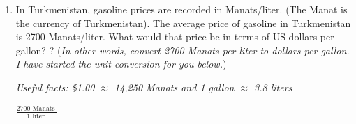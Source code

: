 \documentclass[12pt]{article}
\begin{document}
\begin{enumerate}
\noindent \hrulefill

\item In Turkmenistan, gasoline prices are recorded in Manats/liter.  (The Manat is the currency of Turkmenistan).  The average price of gasoline in Turkmenistan is 2700 Manats/liter.  What would that price be in terms of US dollars per gallon? ? (\emph{In other words, convert 2700 Manats per liter to dollars per gallon.  I have started the unit conversion for you below.})


\emph{Useful facts:  \$1.00 $\approx$ 14,250 Manats and 1 gallon $\approx$ 3.8 liters }\vfill


\vspace{0.1in}

$ \displaystyle \frac{ 2700 \mbox{ Manats } }{1 \mbox{ liter } }$
\vfill






\end{enumerate}



\end{document}
